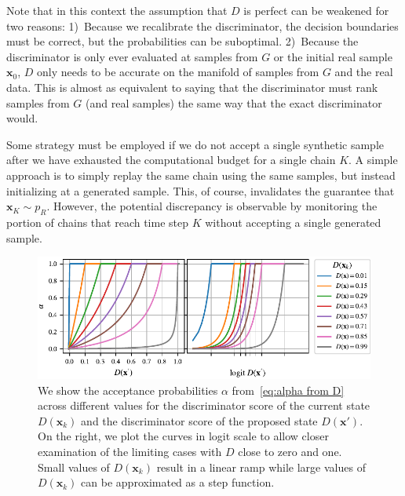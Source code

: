 \documentclass{article}
\renewcommand{\vec}[1]{{\boldsymbol{\mathbf{#1}}}} %
\newcommand{\sample}{\sim}
\newcommand{\PR}{{p_R}}
\newcommand{\accept}{\alpha}
\begin{document}
Note that in this context the assumption that $D$ is perfect can be weakened for two reasons:
1)~Because we recalibrate the discriminator, the decision boundaries must be correct, but the probabilities can be suboptimal.
2)~Because the discriminator is only ever evaluated at samples from $G$ or the initial real sample $\vec x_0$, $D$ only needs to be accurate on the manifold of samples from $G$ and the real data.
This is almost as equivalent to saying that the discriminator must rank samples from $G$ (and real samples) the same way that the exact discriminator would.

Some strategy must be employed if we do not accept a single synthetic sample after we have exhausted the computational budget for a single chain $K$.
A simple approach is to simply replay the same chain using the same samples, but instead initializing at a generated sample.
This, of course, invalidates the guarantee that $\vec x_K \sample \PR$.
However, the potential discrepancy is observable by monitoring the portion of chains that reach time step $K$ without accepting a single generated sample.


\begin{figure}
    \centering
    \includegraphics[width=\textwidth]{figures/alpha2.pdf}
    \caption{{\small
    We show the acceptance probabilities $\accept$ from~\eqref{eq:alpha from D} across different values for the discriminator score of the current state $D(\vec x_k)$ and the discriminator score of the proposed state $D(\vec x')$.
    On the right, we plot the curves in logit scale to allow closer examination of the limiting cases with $D$ close to zero and one.
    Small values of $D(\vec x_k)$ result in a linear ramp while large values of $D(\vec x_k)$ can be approximated as a step function.
    }}
    \label{fig:alpha}
\end{figure}
\end{document}
